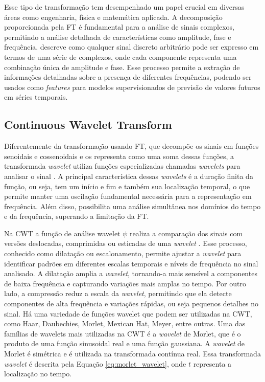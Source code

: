 Esse tipo de transformação tem desempenhado um papel crucial em diversas áreas como engenharia, física e matemática aplicada. A decomposição proporcionada pela FT é fundamental para a análise de sinais complexos, permitindo a análise detalhada de características como amplitude, fase e frequência. \cite{bracewell1978} descreve como qualquer sinal discreto arbitrário pode ser expresso em termos de uma série de complexos, onde cada componente representa uma combinação única de amplitude e fase. Esse processo permite a extração de informações detalhadas sobre a presença de diferentes frequências, podendo ser usados como \textit{features} para modelos supervisionados de previsão de valores futuros em séries temporais.

\subsection{Continuous Wavelet Transform}

Diferentemente da transformação usando FT, que decompõe os sinais em funções senoidais e cossenoidais e os representa como uma soma dessas funções, a transformada \textit{wavelet} utiliza funções especializadas chamadas \textit{wavelets} para analisar o sinal \citep{bentley1994wavelet}. A principal característica dessas \textit{wavelets} é a duração finita da função, ou seja, tem um início e fim e também sua localização temporal, o que permite manter uma oscilação fundamental necessária para a representação em frequência. Além disso, possibilita uma análise simultânea nos domínios do tempo e da frequência, superando a limitação da FT.


Na CWT a função de análise wavelet \( \psi \) realiza a comparação dos sinais com versões deslocadas, comprimidas ou esticadas de uma \textit{wavelet} \citep{fourierwavelet}. Esse processo, conhecido como dilatação ou escalonamento, permite ajustar a \textit{wavelet} para identificar padrões em diferentes escalas temporais e níveis de frequência no sinal analisado. A dilatação amplia a \textit{wavelet}, tornando-a mais sensível a componentes de baixa frequência e capturando variações mais amplas no tempo. Por outro lado, a compressão reduz a escala da \textit{wavelet}, permitindo que ela detecte componentes de alta frequência e variações rápidas, ou seja pequenos detalhes no sinal. Há uma variedade de funções wavelet que podem ser utilizadas na CWT, como Haar, Daubechies, Morlet, Mexican Hat, Meyer, entre outras.  Uma das famílias de wavelets mais utilizadas na CWT é a \textit{wavelet} de Morlet, que é o produto de uma função sinusoidal real e uma função gaussiana. A \textit{wavelet} de Morlet é simétrica e é utilizada na transformada contínua real. Essa transformada \textit{wavelet} é descrita pela Equação \eqref{eq:morlet_wavelet}, onde 
$t$ representa a localização no tempo.

